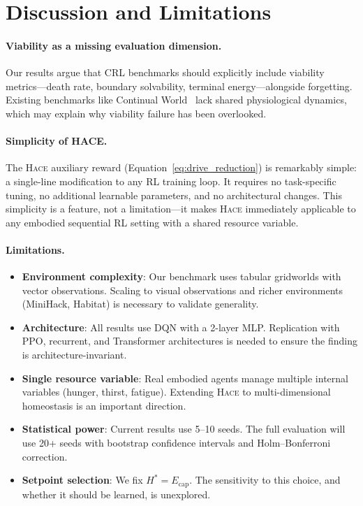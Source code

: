 \documentclass{article}
\newcommand{\setpoint}{H^*}
\newcommand{\energy}{E}
\newcommand{\hace}{\textsc{Hace}}
\begin{document}
\section{Discussion and Limitations}
\label{sec:discussion}

\paragraph{Viability as a missing evaluation dimension.}
Our results argue that CRL benchmarks should explicitly include viability
metrics---death rate, boundary solvability, terminal energy---alongside
forgetting. Existing benchmarks like Continual World~\citep{continualworld2021}
lack shared physiological dynamics, which may explain why viability failure
has been overlooked.

\paragraph{Simplicity of HACE.}
The \hace{} auxiliary reward (Equation~\ref{eq:drive_reduction}) is
remarkably simple: a single-line modification to any RL training loop.
It requires no task-specific tuning, no additional learnable parameters,
and no architectural changes. This simplicity is a feature, not a
limitation---it makes \hace{} immediately applicable to any embodied
sequential RL setting with a shared resource variable.

\paragraph{Limitations.}

\begin{itemize}[leftmargin=*,topsep=1pt,itemsep=1pt]
  \item \textbf{Environment complexity}: Our benchmark uses tabular
        gridworlds with vector observations. Scaling to visual observations
        and richer environments (MiniHack, Habitat) is necessary to
        validate generality.
  \item \textbf{Architecture}: All results use DQN with a 2-layer MLP.
        Replication with PPO, recurrent, and Transformer architectures
        is needed to ensure the finding is architecture-invariant.
  \item \textbf{Single resource variable}: Real embodied agents manage
        multiple internal variables (hunger, thirst, fatigue). Extending
        \hace{} to multi-dimensional homeostasis is an important
        direction.
  \item \textbf{Statistical power}: Current results use 5--10 seeds.
        The full evaluation will use 20+ seeds with bootstrap confidence
        intervals and Holm--Bonferroni correction.
  \item \textbf{Setpoint selection}: We fix $\setpoint = \energy_{\mathrm{cap}}$.
        The sensitivity to this choice, and whether it should be learned,
        is unexplored.
\end{itemize}
\end{document}
